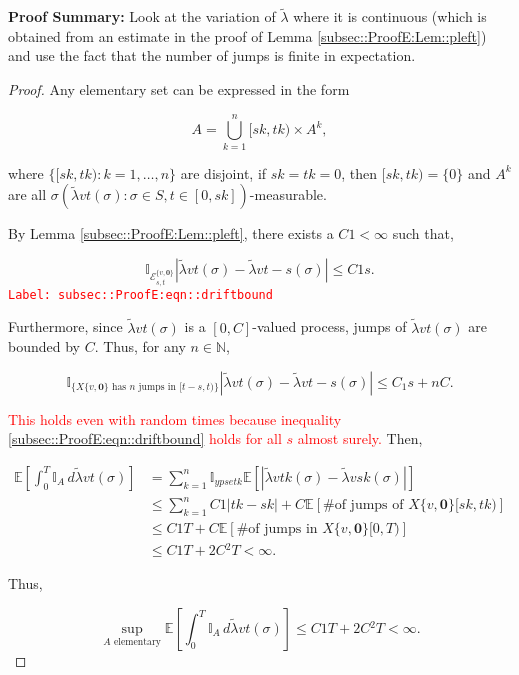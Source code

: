 \documentclass[12pt]{article}
\newcommand{\mb}{\mathbb}
\newcommand{\mc}{\mathcal}
\newcommand{\te}{\text}
\newcommand{\tr}{\textcolor{red}}
\newcommand{\labe}[1]{\tr{\texttt{Label: #1}}}
\newcommand{\pfsum}{\textbf{Proof Summary: }}
\newcommand{\ex}[1]{\mb{E}\left[#1\right]}			%
\renewcommand{\root}{\mathbf{0}}				%
\renewcommand{\v}{v}							%
\renewcommand{\S}{S}							%
\newcommand{\s}{\sigma}							%
\newcommand{\T}{T}								%
\renewcommand{\t}{t}							%
\renewcommand{\tt}{s}							%
\newcommand{\X}{X}								%
\newcommand{\const}{C}							%
\newcommand{\sln}[1]{^{#1}}						%
\newcommand{\alt}[1]{\widetilde{#1}}			%
\renewcommand{\it}{k}							%
\newcommand{\evnt}{\mc{E}}						%
\newcommand{\typset}{A}							%
\newcommand{\crate}{\alt{\lambda}}				%
\begin{document}
\pfsum Look at the variation of \(\crate\) where it is continuous (which is obtained from an estimate in the proof of Lemma \ref{subsec::ProofE:Lem::pleft}) and use the fact that the number of jumps is finite in expectation.

\begin{proof}
Any elementary set can be expressed in the form

\[\typset = \bigcup_{\it = 1}^n [\tt{\it},\t{\it})\times \typset\sln{\it},\]

where \(\{[\tt{\it},\t{\it}):\it=1,\dots,n\}\) are disjoint, if \(\tt{\it} = \t{\it} = 0\), then \([\tt{\it},\t{\it}) = \{0\}\) and \(\typset\sln{\it}\) are all \(\sigma(\crate{\v}{\t}(\s):\s \in \S,\t\in [0,\tt{\it}])\)-measurable. 

By Lemma \ref{subsec::ProofE:Lem::pleft}, there exists a \(\const{1} < \infty\) such that,

\begin{equation}
\mb{I}_{\evnt{}^{\{\v,\root\}}_{\tt,\t}}|\crate{\v}{\t}(\s) - \crate{\v}{\t-\tt}(\s)| \leq \const{1}\tt.
\label{subsec::ProofE:eqn::driftbound}
\end{equation}
\labe{subsec::ProofE:eqn::driftbound}

Furthermore, since \(\crate{\v}{\t}(\s)\) is a \([0,\const{}]\)-valued process, jumps of \(\crate{\v}{\t}(\s)\) are bounded by \(\const{}\). Thus, for any \(n \in \mb{N}\),

\[\mb{I}_{\{\X{\{\v,\root\}}{}\te{ has }n\te{ jumps in } [\t-\tt,\t)\}}|\crate{\v}{\t}(\s) - \crate{\v}{\t-\tt}(\s)|\leq C_1\tt + n \const{}.\]

\tr{This holds even with random times because inequality \eqref{subsec::ProofE:eqn::driftbound} holds for all \(\tt\) almost surely.} Then,

\begin{align*}
\ex{\int_0^\T \mb{I}_\typset\,d\crate{\v}{\t}(\s)} &= \sum_{\it = 1}^n \mb{I}_{	ypset{\it}}\ex{\left|\crate{\v}{\t{k}}(\s) - \crate{\v}{\tt{\it}}(\s)\right|}\\
&\leq \sum_{\it=1}^n \const{1}|\t{\it} - \tt{\it}| + \const{}\ex{\te{\# of jumps of }\X{\{\v,\root\}}{[\tt{\it},\t{\it})}}\\
&\leq \const{1}\T + \const{}\ex{\te{\# of jumps in }\X{\{\v,\root\}}{[0,\T)}}\\
&\leq \const{1}\T + 2\const{}^2\T < \infty.
\end{align*}

Thus,

\[\sup_{\typset\te{ elementary}} \ex{\int_0^\T \mb{I}_\typset\,d\crate{\v}{\t}(\s)} \leq \const{1}\T + 2\const{}^2\T < \infty.\]
\end{proof}
\end{document}
